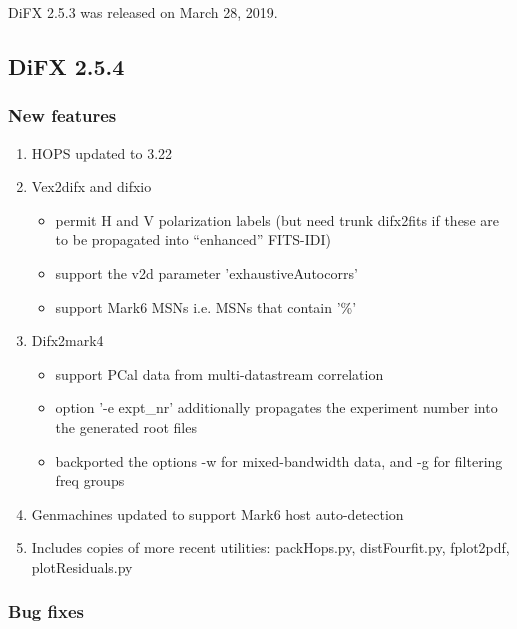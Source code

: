DiFX 2.5.3 was released on March 28, 2019.

\subsection{DiFX 2.5.4}

\subsubsection{New features}

\begin{enumerate}
\item HOPS updated to 3.22
\item Vex2difx and difxio
\begin{itemize}
  \item permit H and V polarization labels (but need trunk difx2fits if these are to be propagated into “enhanced” FITS-IDI)
  \item support the v2d parameter 'exhaustiveAutocorrs'
  \item support Mark6 MSNs i.e. MSNs that contain '\%'
\end{itemize}
\item Difx2mark4
\begin{itemize}
  \item support PCal data from multi-datastream correlation
  \item option '-e expt\_nr' additionally propagates the experiment number into the generated root files
  \item backported the options -w for mixed-bandwidth data, and -g for filtering freq groups
\end{itemize}
\item Genmachines updated to support Mark6 host auto-detection
\item Includes copies of more recent utilities: packHops.py, distFourfit.py, fplot2pdf, plotResiduals.py
\end{enumerate}

\subsubsection{Bug fixes}

